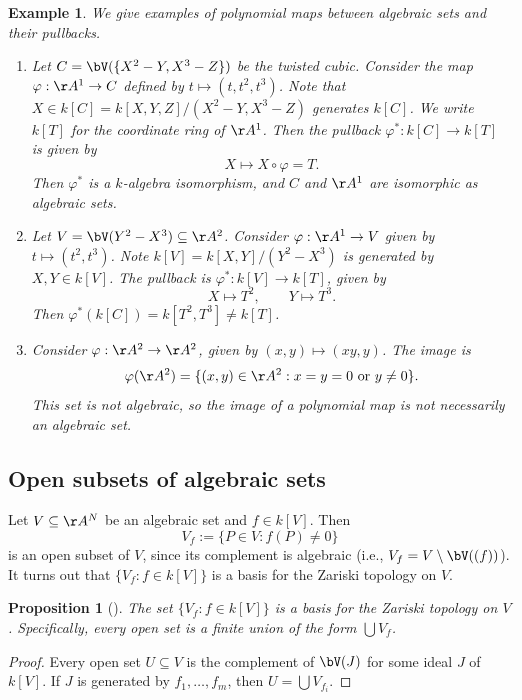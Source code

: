 \documentclass[12pt]{amsart}
\theoremstyle{plain}
\newtheorem{proposition}[theorem]{Proposition}
\newtheorem{example}[theorem]{Example}
\begin{document}
\begin{example}We give examples of polynomial maps between algebraic sets and their pullbacks.
\begin{enumerate}
\item 
Let $C = \bV(\{X^2-Y, X^3-Z\})$ be the twisted cubic.
Consider the map $\varphi : \AA^1 \to C$ defined by $t \mapsto (t, t^2, t^3)$.
Note that $X \in k[C] = k[X, Y, Z]/(X^2-Y, X^3-Z)$ generates $k[C]$.
We write $k[T]$ for the coordinate ring of $\AA^1$.
Then the pullback $\varphi^* : k[C] \to k[T]$ is given by
$$X \mapsto X \circ \varphi = T.$$
Then $\varphi^*$ is a $k$-algebra isomorphism, and $C$ and $\AA^1$ are isomorphic as algebraic sets.

\item
Let $V = \bV(Y^2-X^3)\subseteq\AA^2$.
Consider $\varphi:\AA^1 \to V$ given by $t \mapsto (t^2, t^3)$.
Note $k[V] = k[X, Y]/(Y^2 - X^3)$ is generated by $X, Y \in k[V]$.
The pullback is $\varphi^*:k[V] \to k[T]$, given by
$$X \mapsto T^2, \qquad Y \mapsto T^3.$$
Then $\varphi^*(k[C]) = k[T^2, T^3] \ne k[T]$.

\item
Consider $\varphi:\AA^2 \to \AA^2$, given by $(x, y) \mapsto (xy, y)$.
The image is
$$\varphi(\AA^2) = \{(x,y) \in \AA^2 : x=y=0 \text{ or } y \ne 0\}.$$
This set is not algebraic, so the image of a polynomial map is not necessarily an algebraic set.
\end{enumerate}
\end{example}

\subsection{Open subsets of algebraic sets}
Let $V \subseteq \AA^N$ be an algebraic set and $f \in k[V]$.
Then 
$$V_f := \{P \in V : f(P) \ne 0\}$$
is an open subset of $V$, since its complement is algebraic (i.e., $V_f = V \setminus \bV((f))$).
It turns out that $\{V_f : f \in k[V]\}$ is a basis for the Zariski topology on $V$.

\begin{proposition}[{\cite[Proposition 2.37]{Milne13}}]
The set $\{V_f : f \in k[V]\}$ is a basis for the Zariski topology on $V$.
Specifically, every open set is a finite union of the form $\bigcup V_f$.
\end{proposition}
\begin{proof}
Every open set $U \subseteq V$ is the complement of $\bV(J)$ for some ideal $J$ of $k[V]$.
If $J$ is generated by $f_1, \ldots, f_m$, then $U = \bigcup V_{f_i}.$
\end{proof}
\end{document}

